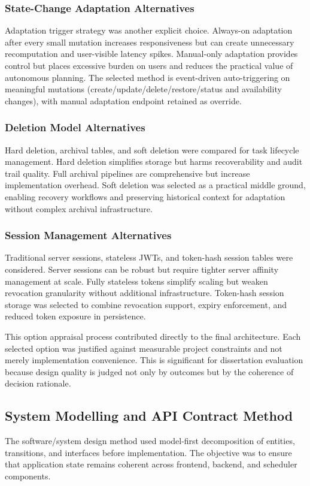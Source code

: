 \documentclass[12pt]{article}
\begin{document}
\subsubsection{State-Change Adaptation Alternatives}
Adaptation trigger strategy was another explicit choice. Always-on adaptation after every small mutation increases responsiveness but can create unnecessary recomputation and user-visible latency spikes. Manual-only adaptation provides control but places excessive burden on users and reduces the practical value of autonomous planning. The selected method is event-driven auto-triggering on meaningful mutations (create/update/delete/restore/status and availability changes), with manual adaptation endpoint retained as override.

\subsubsection{Deletion Model Alternatives}
Hard deletion, archival tables, and soft deletion were compared for task lifecycle management. Hard deletion simplifies storage but harms recoverability and audit trail quality. Full archival pipelines are comprehensive but increase implementation overhead. Soft deletion was selected as a practical middle ground, enabling recovery workflows and preserving historical context for adaptation without complex archival infrastructure.

\subsubsection{Session Management Alternatives}
Traditional server sessions, stateless JWTs, and token-hash session tables were considered. Server sessions can be robust but require tighter server affinity management at scale. Fully stateless tokens simplify scaling but weaken revocation granularity without additional infrastructure. Token-hash session storage was selected to combine revocation support, expiry enforcement, and reduced token exposure in persistence.

This option appraisal process contributed directly to the final architecture. Each selected option was justified against measurable project constraints and not merely implementation convenience. This is significant for dissertation evaluation because design quality is judged not only by outcomes but by the coherence of decision rationale.

\subsection{System Modelling and API Contract Method}
The software/system design method used model-first decomposition of entities, transitions, and interfaces before implementation. The objective was to ensure that application state remains coherent across frontend, backend, and scheduler components.
\end{document}

